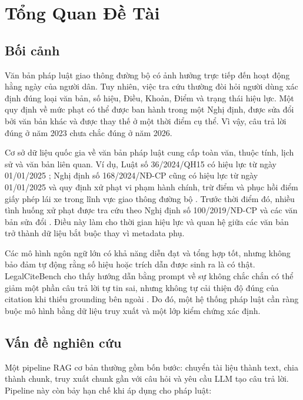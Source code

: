 \documentclass[a4paper,12pt]{extreport}
\begin{document}
\chapter{Tổng Quan Đề Tài}

\section{Bối cảnh}

Văn bản pháp luật giao thông đường bộ có ảnh hưởng trực tiếp đến hoạt động hằng ngày của người dân. Tuy nhiên, việc tra cứu thường đòi hỏi người dùng xác định đúng loại văn bản, số hiệu, Điều, Khoản, Điểm và trạng thái hiệu lực. Một quy định về mức phạt có thể được ban hành trong một Nghị định, được sửa đổi bởi văn bản khác và được thay thế ở một thời điểm cụ thể. Vì vậy, câu trả lời đúng ở năm 2023 chưa chắc đúng ở năm 2026.

Cơ sở dữ liệu quốc gia về văn bản pháp luật cung cấp toàn văn, thuộc tính, lịch sử và văn bản liên quan. Ví dụ, Luật số 36/2024/QH15 có hiệu lực từ ngày 01/01/2025 \cite{luat36_2024}; Nghị định số 168/2024/NĐ-CP cũng có hiệu lực từ ngày 01/01/2025 và quy định xử phạt vi phạm hành chính, trừ điểm và phục hồi điểm giấy phép lái xe trong lĩnh vực giao thông đường bộ \cite{nghidinh168_2024}. Trước thời điểm đó, nhiều tình huống xử phạt được tra cứu theo Nghị định số 100/2019/NĐ-CP và các văn bản sửa đổi \cite{nghidinh100_2019}. Điều này làm cho thời gian hiệu lực và quan hệ giữa các văn bản trở thành dữ liệu bắt buộc thay vì metadata phụ.

Các mô hình ngôn ngữ lớn có khả năng diễn đạt và tổng hợp tốt, nhưng không bảo đảm tự động rằng số hiệu hoặc trích dẫn được sinh ra là có thật. LegalCiteBench cho thấy hướng dẫn bằng prompt về sự không chắc chắn có thể giảm một phần câu trả lời tự tin sai, nhưng không tự cải thiện độ đúng của citation khi thiếu grounding bên ngoài \cite{chen2026legalcitebench}. Do đó, một hệ thống pháp luật cần ràng buộc mô hình bằng dữ liệu truy xuất và một lớp kiểm chứng xác định.

\section{Vấn đề nghiên cứu}

Một pipeline RAG cơ bản thường gồm bốn bước: chuyển tài liệu thành text, chia thành chunk, truy xuất chunk gần với câu hỏi và yêu cầu LLM tạo câu trả lời. Pipeline này còn bảy hạn chế khi áp dụng cho pháp luật:
\end{document}
